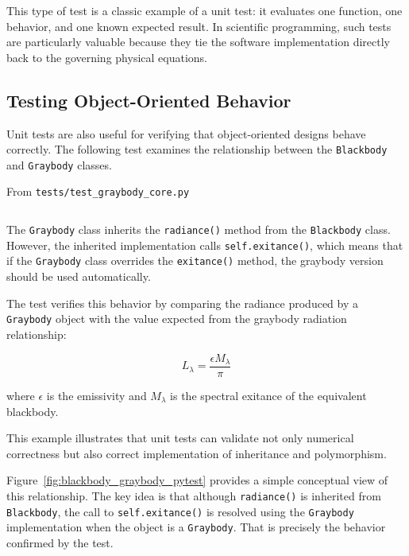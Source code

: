 This type of test is a classic example of a unit test: it evaluates one function, one behavior, and one known expected result. In scientific programming, such tests are particularly valuable because they tie the software implementation directly back to the governing physical equations.

\subsection{Testing Object-Oriented Behavior}

Unit tests are also useful for verifying that object-oriented designs behave correctly. The following test examines the relationship between the \texttt{Blackbody} and \texttt{Graybody} classes.

\vspace{0.5em}

From \texttt{tests/test\_graybody\_core.py}
\inputminted[firstline=45,lastline=61]{python}{code/graybody/tests/test_graybody_core.py}

\vspace{0.5em}

The \texttt{Graybody} class inherits the \texttt{radiance()} method from the \texttt{Blackbody} class. However, the inherited implementation calls \texttt{self.exitance()}, which means that if the \texttt{Graybody} class overrides the \texttt{exitance()} method, the graybody version should be used automatically.

The test verifies this behavior by comparing the radiance produced by a \texttt{Graybody} object with the value expected from the graybody radiation relationship:

\[
L_\lambda = \frac{\epsilon M_\lambda}{\pi}
\]

where $\epsilon$ is the emissivity and $M_\lambda$ is the spectral exitance of the equivalent blackbody.

This example illustrates that unit tests can validate not only numerical correctness but also correct implementation of inheritance and polymorphism.

Figure~\ref{fig:blackbody_graybody_pytest} provides a simple conceptual view of this relationship. The key idea is that although \texttt{radiance()} is inherited from \texttt{Blackbody}, the call to \texttt{self.exitance()} is resolved using the \texttt{Graybody} implementation when the object is a \texttt{Graybody}. That is precisely the behavior confirmed by the test.

\vspace{2em}

